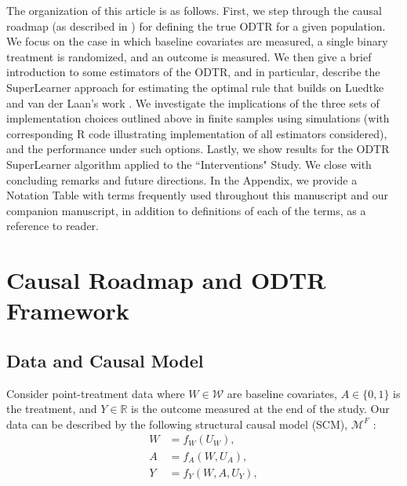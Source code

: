\documentclass[a4paper,12pt]{article}
\begin{document}
The organization of this article is as follows. First, we step through the causal roadmap (as described in \cite{petersen2014causal}) for defining the true ODTR for a given population. We focus on the case in which baseline covariates are measured, a single binary treatment is randomized, and an outcome is measured. We then give a brief introduction to some estimators of the ODTR, and in particular, describe the SuperLearner approach for estimating the optimal rule that builds on Luedtke and van der Laan's work \citep{luedtke2016super}. We investigate the implications of the three sets of implementation choices outlined above in finite samples using simulations (with corresponding R code illustrating implementation of all estimators considered), and the performance under such options. Lastly, we show results for the ODTR SuperLearner algorithm applied to the ``Interventions" Study. We close with concluding remarks and future directions. In the Appendix, we provide a Notation Table with terms frequently used throughout this manuscript and our companion manuscript, in addition to definitions of each of the terms, as a reference to reader.  



\section{Causal Roadmap and ODTR Framework}\label{sec2}

\subsection{Data and Causal Model}

Consider point-treatment data where $W \in \mathcal{W}$ are baseline covariates, $A \in \{0,1\}$ is the treatment, and $Y \in \mathbb{R}$ is the outcome measured at the end of the study. Our data can be described by the following structural causal model (SCM), $\mathcal{M}^F$ \citep{pearl2000causality}:
\begin{align*}
    W& =f_W (U_W ),\\
    A&=f_A (W,U_A),\\
    Y&=f_Y (W,A,U_Y), 
\end{align*}
\end{document}
